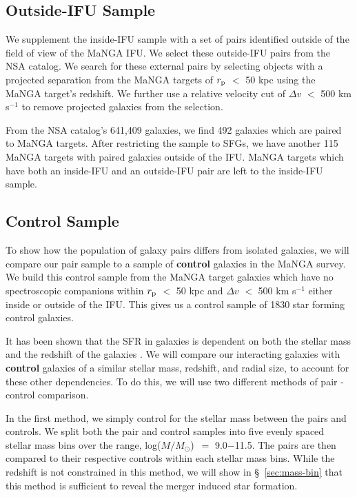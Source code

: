\documentclass[iop,revtex4,twocolumn,apj,numberedappendix,appendixfloats]{emulateapj}
\newcommand{\logm}{log($M/M_{\odot}$)}
\begin{document}
\subsection{Outside-IFU Sample}\label{sec:outside}

We supplement the inside-IFU sample with a set of pairs identified outside of the field of view of the MaNGA IFU. We select these outside-IFU pairs from the NSA catalog. We search for these external pairs by selecting objects with a projected separation from the MaNGA targets of $r_{\rm p}$ $<$ 50 kpc using the MaNGA target's redshift. We further use a relative velocity cut of $\Delta v$ $<$ 500 km s$^{-1}$ to remove projected galaxies from the selection. 

From the NSA catalog's 641,409 galaxies, we find 492 galaxies which are paired to MaNGA targets. After restricting the sample to SFGs, we have another 115 MaNGA targets with paired galaxies outside of the IFU. MaNGA targets which have both an inside-IFU and an outside-IFU pair are left to the inside-IFU sample.

\subsection{Control Sample}\label{sec:control}

To show how the population of galaxy pairs differs from isolated galaxies, we will compare our pair sample to a sample of \textbf{control} galaxies in the MaNGA survey. We build this control sample from the MaNGA target galaxies which have no spectroscopic companions within $r_{\rm p}$ $<$ 50 kpc and $\Delta v$ $<$ 500 km s$^{-1}$ either inside or outside of the IFU. This gives us a control sample of 1830 star forming control galaxies. 

It has been shown that the SFR in galaxies is dependent on both the stellar mass and the redshift of the galaxies \citep[e.g.,][]{Noeske:2007}. We will compare our interacting galaxies with \textbf{control} galaxies of a similar stellar mass, redshift, and radial size, to account for these other dependencies. To do this, we will use two different methods of pair - control comparison. 

In the first method, we simply control for the stellar mass between the pairs and controls. We split both the pair and control samples into five evenly spaced stellar mass bins over the range, \logm\ $=$ 9.0$-$11.5. The pairs are then compared to their respective controls within each stellar mass bins. While the redshift is not constrained in this method, we will show in \S~\ref{sec:mass-bin} that this method is sufficient to reveal the merger induced star formation. 
\end{document}
